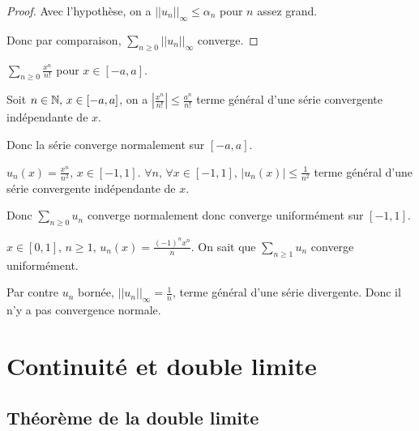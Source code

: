 \begin{proof}
    Avec l'hypothèse, on a $||u_n||_\infty \leqslant \alpha_n$ pour $n$ assez grand. 

    Donc par comparaison, $\displaystyle \sum_{n \geqslant 0} || u_n ||_{\infty}$ converge.
\end{proof}

\begin{exemple}
    $\displaystyle \sum_{n \geqslant 0 } \frac{x^n }{n!}$ pour $x \in [-a, a]$. 

    Soit $n \in \mathbb{N}, \, x \in [-a, a]$, on a $\left| \frac{x^n }{n !} \right| \leqslant \frac{a^n }{n!}$ 
    terme général d'une série convergente indépendante de $x$.

    Donc la série converge normalement sur $[-a, a]$.

    \lvspace $u_n(x) = \frac{x^n }{n^2}, \, x \in [-1, 1]$. $\forall n, \, \forall x \in [-1, 1], \, |u_n(x)| \leqslant \frac{1 }{n^2}$
    terme général d'une série convergente indépendante de $x$.

    Donc $\displaystyle \sum_{n \geqslant 0} u_n$ converge normalement donc converge uniformément sur $[-1, 1]$.

    \lvspace $\displaystyle x \in [0, 1], \, n \geqslant 1, \, u_n(x) = \frac{(-1)^n x^n} n$. On sait que 
    $\displaystyle \sum_{n \geqslant 1} u_n$ converge uniformément. 

    Par contre  $u_n$ bornée, $||u_n||_{\infty} = \frac 1 n$, terme général d'une série divergente. Donc il 
    n'y a pas convergence normale.
\end{exemple}


\section{Continuité et double limite}
\subsection{Théorème de la double limite} 

